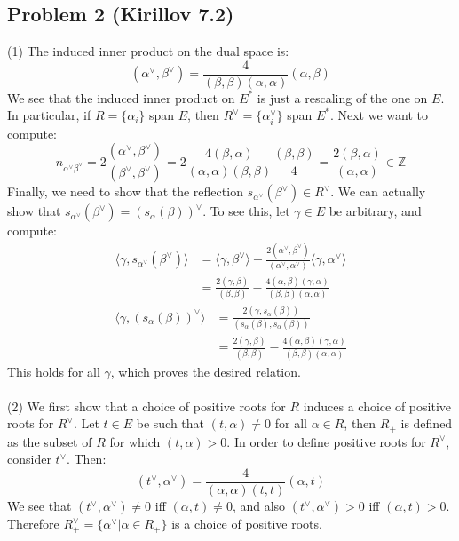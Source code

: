 \documentclass[12 pt]{article}
\newcommand{\Z}{\mathbb{Z}}
\begin{document}
\subsection*{Problem 2 (Kirillov 7.2)}
(1) The induced inner product on the dual space is:
\[      (\alpha^{\vee}, \beta^{\vee}) = \frac{4}{(\beta, \beta) (\alpha, \alpha)} (\alpha, \beta)     \]
We see that the induced inner product on $E^*$ is just a rescaling of the one on $E$. In particular, if $R = \{\alpha_i\}$ span $E$, then $R^{\vee} = \{ \alpha_i^{\vee}\}$ span $E^*$. Next we want to compute:
\[       n_{\alpha^{\vee} \beta^{\vee}} = 2 \frac{(\alpha^{\vee}, \beta^{\vee})}{(\beta^{\vee} , \beta^{\vee})} =2 \frac{4 (\beta, \alpha)}{(\alpha,\alpha)(\beta, \beta)} \frac{(\beta, \beta)}{4} = \frac{2(\beta, \alpha)}{(\alpha, \alpha)} \in \Z  \]
Finally, we need to show that the reflection $s_{\alpha^{\vee}}(\beta^{\vee}) \in R^{\vee}$. We can actually show that $s_{\alpha^{\vee}} (\beta^{\vee}) = (s_{\alpha}(\beta))^{\vee}$. To see this, let $\gamma \in E$ be arbitrary, and compute:
\begin{align*}
\langle \gamma, s_{\alpha^{\vee}} (\beta^{\vee})\rangle &= \langle \gamma, \beta^{\vee} \rangle - \frac{2(\alpha^{\vee}, \beta^{\vee})}{(\alpha^{\vee}, \alpha^{\vee})} \langle \gamma, \alpha^{\vee} \rangle \\
&= \frac{2(\gamma, \beta)}{(\beta, \beta)} - \frac{4(\alpha, \beta)(\gamma, \alpha)}{(\beta, \beta) (\alpha, \alpha)}
\end{align*}
\begin{align*}
\langle \gamma, (s_{\alpha}(\beta))^{\vee} \rangle &= \frac{2(\gamma, s_{\alpha}(\beta))}{(s_{\alpha}(\beta),s_{\alpha}(\beta))} \\
&=  \frac{2(\gamma, \beta)}{(\beta, \beta)} - \frac{4(\alpha, \beta)(\gamma, \alpha)}{(\beta, \beta) (\alpha, \alpha)}
\end{align*}
This holds for all $\gamma$, which proves the desired relation.
\\
\\
(2) We first show that a choice of positive roots for $R$ induces a choice of positive roots for $R^{\vee}$. Let $t \in E$ be such that $(t, \alpha) \neq 0$ for all $\alpha \in R$, then $R_+$ is defined as the subset of $R$ for which $(t, \alpha) > 0$. In order to define positive roots for $R^{\vee}$, consider $t^{\vee}$. Then:
\[      (t^{\vee}, \alpha^{\vee}) = \frac{4}{(\alpha, \alpha) (t,t)} (\alpha, t)      \]
We see that $(t^{\vee} , \alpha^{\vee}) \neq 0$ iff $(\alpha, t) \neq 0$, and also $(t^{\vee} , \alpha^{\vee}) > 0$ iff $(\alpha, t) > 0$. Therefore $R^{\vee}_+ = \{ \alpha^{\vee} | \alpha \in R_+ \}$ is a choice of positive roots.
\end{document}
